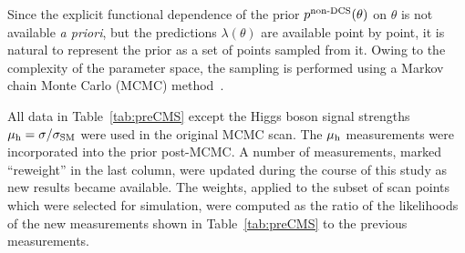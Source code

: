 Since the explicit functional dependence of the prior $p^\textrm{non-DCS}(\theta)$ on
$\theta$ is not available \emph{a priori}, but the predictions $\lambda(\theta)$ are available point by point, it is natural to represent the prior as a set of points sampled from it.  Owing to the complexity of the parameter space, the sampling is performed
using a Markov chain Monte Carlo (MCMC) 
method~\cite{MCMC1,MCMC2,MCMC3,MCMC4,Bayes:2}. 




All data in Table~\ref{tab:preCMS} except the Higgs boson signal strengths $\mu_{\rm h}=\sigma/\sigma_{\text{SM}}$ were used in the
original MCMC scan. The $\mu_{\rm h}$ measurements were incorporated into the prior post-MCMC.    
A number of measurements, marked ``reweight'' in the last column, were updated during the course of this study as new results
became available.  The weights, applied to the subset of scan points which were selected for simulation, were computed as the ratio of the likelihoods of the new measurements shown in
Table~\ref{tab:preCMS} to the previous measurements.    



